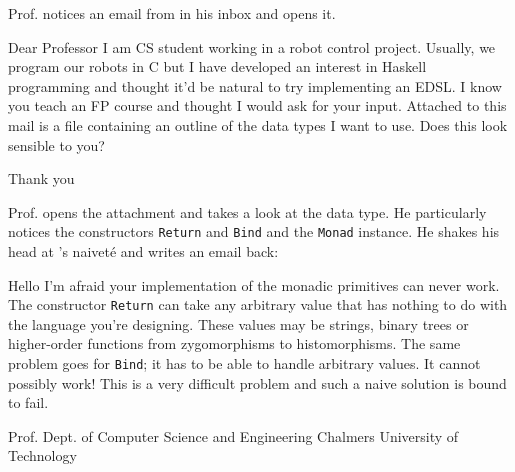 \noindent Prof. \docname{} notices an email from \studname{} in his inbox and 
opens it. 

\vspace{5mm} 

\noindent\colorbox{light-gray}{
\begin{minipage}[]{0.9\linewidth}
\noindent 
Dear Professor \docname{}
\newline \newline
\noindent I am CS student working in a robot control project. Usually, we 
program our robots in C but I have developed an interest in Haskell 
programming and thought it'd be natural to try implementing an EDSL. 
I know you teach an FP course and thought I would ask for your input. 
Attached to this mail is a file containing an outline of the data types I 
want to use. Does this look sensible to you? \newline \newline

\noindent Thank you \newline
\noindent \studname{}
\end{minipage} 
}

\vspace{5mm}

Prof. \docname{} opens the attachment and takes a look at the data type. He 
particularly notices the constructors {\tt Return} and {\tt Bind} and the 
{\tt Monad} instance. He shakes his head at \studname{}'s naivet\'e and writes an 
email back:


\noindent\colorbox{light-gray}{
\begin{minipage}[]{0.9\linewidth}
\noindent 
Hello \studname{}
\newline \newline
\noindent I'm afraid your implementation of the monadic primitives can never 
work. The constructor {\tt Return} can take any arbitrary value that has 
nothing to do with the language you're designing. These values may be 
strings, binary trees or higher-order functions from zygomorphisms to 
histomorphisms. The same problem goes for {\tt Bind}; it has to be able 
to handle arbitrary values. It cannot possibly work! This is a very 
difficult problem and such a naive solution is bound to fail. 
\newline \newline

\noindent Prof. \docname{} \newline
\noindent Dept. of Computer Science and Engineering \newline
\noindent Chalmers University of Technology 
\end{minipage} 
}

